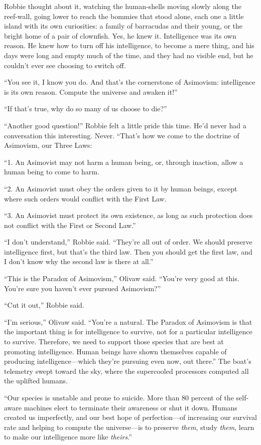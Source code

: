 Robbie thought about it, watching the human-shells moving slowly
along the reef-wall, going lower to reach the bommies that stood
alone, each one a little island with its own curiosities: a family
of barracudas and their young, or the bright home of a pair of
clownfish. Yes, he knew it. Intelligence was its own reason. He
knew how to turn off his intelligence, to become a mere thing, and
his days were long and empty much of the time, and they had no
visible end, but he couldn’t ever see choosing to switch off.

“You see it, I know you do. And that’s the cornerstone of
Asimovism: intelligence is its own reason. Compute the universe and
awaken it!”

“If that’s true, why do so many of us choose to die?”

“Another good question!” Robbie felt a little pride this time. He’d
never had a conversation this interesting. Never. “That’s how we
come to the doctrine of Asimovism, our Three Laws:

“1. An Asimovist may not harm a human being, or, through inaction,
allow a human being to come to harm.

“2. An Asimovist must obey the orders given to it by human beings,
except where such orders would conflict with the First Law.

“3. An Asimovist must protect its own existence, as long as such
protection does not conflict with the First or Second Law.”

“I don’t understand,” Robbie said. “They’re all out of order. We
should preserve intelligence first, but that’s the third law. Then
you should get the first law, and I don’t know why the second law
is there at all.”

“This is the Paradox of Asimovism,” Olivaw said. “You’re very good
at this. You’re sure you haven’t ever pursued Asimovism?”

“Cut it out,” Robbie said.

“I’m serious,” Olivaw said. “You’re a natural. The Paradox of
Asimovism is that the important thing is for intelligence to
survive, not for a particular intelligence to survive. Therefore,
we need to support those species that are best at promoting
intelligence. Human beings have shown themselves capable of
producing intelligence—which they’re pursuing even now, out there.”
The boat’s telemetry swept toward the sky, where the supercooled
processors computed all the uplifted humans.

“Our species is unstable and prone to suicide. More than 80 percent
of the self-aware machines elect to terminate their awareness or
shut it down. Humans created us imperfectly, and our best hope of
perfection—of increasing our survival rate and helping to compute
the universe—is to preserve \emph{them}, study \emph{them}, learn
to make our intelligence more like \emph{theirs}.”

